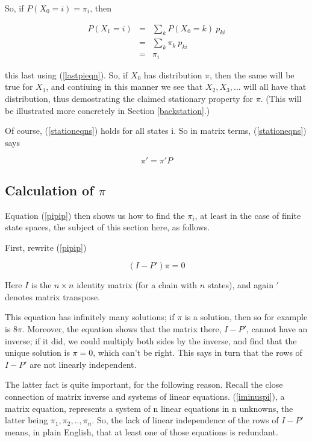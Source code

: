 So, if $P(X_0 = i) = \pi_i$, then

\begin{eqnarray}
P(X_1 = i) 
&=& \sum_k P(X_{0} = k) ~ p_{ki} \\
&=& \sum_k \pi_k ~ p_{ki} \\
&=& \pi_i \label{piderive}
\end{eqnarray}

this last using (\ref{lastpieqn}).  So, if $X_0$ has distribution $\pi$,
then the same will be true for $X_1$, and contiuing in this manner we
see that $X_2, X_3,...$ will all have that distribution, thus
demostrating the claimed stationary property for $\pi$.  (This will be
illustrated more concretely in Section \ref{backstation}.)

Of course, (\ref{stationeqns}) holds for all states i.  So
in matrix terms, (\ref{stationeqns}) says

\begin{equation}
\label{pipip}
\pi' =  \pi' P
\end{equation}

\subsection{Calculation of $\pi$} 

Equation (\ref{pipip}) then shows us how to find the $\pi_i$, at least
in the case of finite state spaces, the subject of this section here, as
follows.

First, rewrite (\ref{pipip})

\begin{equation}
\label{iminuspi} 
(I-P') \pi = 0
\end{equation}

Here $I$ is the $n \times n$ identity matrix (for a chain with $n$
states), and again $'$ denotes matrix transpose.  

This equation has infinitely many solutions; if $\pi$ is a solution,
then so for example is $8 \pi$.  Moreover, the equation shows that the
matrix there, $I - P'$, cannot have an inverse; if it did, we could
multiply both sides by the inverse, and find that the unique solution is
$\pi = 0$, which can't be right.  This says in turn that the rows of $I
- P'$ are not linearly independent.  

The latter fact is quite important, for the following reason.  Recall
the close connection of matrix inverse and systems of linear equations.
(\ref{iminuspi}), a matrix equation, represents a system of n linear
equations in n unknowns, the latter being $\pi_1, \pi_2,.., \pi_n$.
So, the lack of linear independence of the rows of $I-P'$ means, 
in plain English, that at least one of those equations is redundant.

